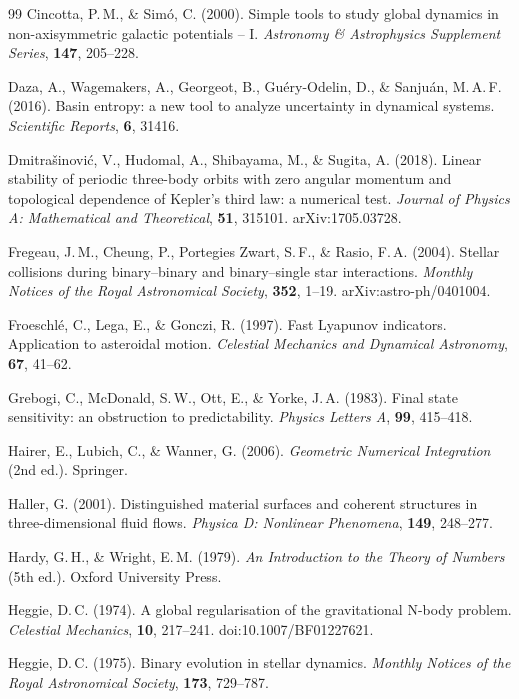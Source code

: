 \documentclass[11pt,a4paper]{article}
\begin{document}
\begin{thebibliography}{99}
Cincotta, P.\,M., \& Sim\'{o}, C. (2000).
Simple tools to study global dynamics in non-axisymmetric galactic potentials -- I.
\textit{Astronomy \& Astrophysics Supplement Series}, \textbf{147}, 205--228.

Daza, A., Wagemakers, A., Georgeot, B., Gu\'{e}ry-Odelin, D., \& Sanju\'{a}n, M.\,A.\,F. (2016).
Basin entropy: a new tool to analyze uncertainty in dynamical systems.
\textit{Scientific Reports}, \textbf{6}, 31416.

Dmitra{\v{s}}inovi{\'c}, V., Hudomal, A., Shibayama, M., \& Sugita, A. (2018).
Linear stability of periodic three-body orbits with zero angular momentum and topological
dependence of Kepler's third law: a numerical test.
\textit{Journal of Physics A: Mathematical and Theoretical}, \textbf{51}, 315101.
arXiv:1705.03728.

Fregeau, J.\,M., Cheung, P., Portegies Zwart, S.\,F., \& Rasio, F.\,A. (2004).
Stellar collisions during binary--binary and binary--single star interactions.
\textit{Monthly Notices of the Royal Astronomical Society}, \textbf{352}, 1--19.
arXiv:astro-ph/0401004.

Froeschl\'{e}, C., Lega, E., \& Gonczi, R. (1997).
Fast Lyapunov indicators. Application to asteroidal motion.
\textit{Celestial Mechanics and Dynamical Astronomy}, \textbf{67}, 41--62.

Grebogi, C., McDonald, S.\,W., Ott, E., \& Yorke, J.\,A. (1983).
Final state sensitivity: an obstruction to predictability.
\textit{Physics Letters A}, \textbf{99}, 415--418.

Hairer, E., Lubich, C., \& Wanner, G. (2006).
\textit{Geometric Numerical Integration} (2nd ed.).
Springer.

Haller, G. (2001).
Distinguished material surfaces and coherent structures in three-dimensional fluid flows.
\textit{Physica D: Nonlinear Phenomena}, \textbf{149}, 248--277.

Hardy, G.\,H., \& Wright, E.\,M. (1979).
\textit{An Introduction to the Theory of Numbers} (5th ed.).
Oxford University Press.

Heggie, D.\,C. (1974).
A global regularisation of the gravitational N-body problem.
\textit{Celestial Mechanics}, \textbf{10}, 217--241.
doi:10.1007/BF01227621.

Heggie, D.\,C. (1975).
Binary evolution in stellar dynamics.
\textit{Monthly Notices of the Royal Astronomical Society}, \textbf{173}, 729--787.


\end{thebibliography}
\end{document}

